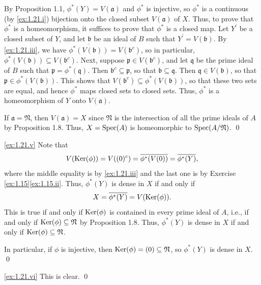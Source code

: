 By Proposition 1.1, $\phi^*(Y) = V(\mathfrak a)$ and $\phi^*$ is injective, so $\phi^*$ is a continuous (by \ref{ex:1.21.i}) bijection onto the closed subset $V(\mathfrak a)$ of $X$.
Thus, to prove that $\phi^*$ is a homeomorphism, it suffices to prove that $\phi^*$ is a closed map.
Let $Y^\prime$ be a closed subset of $Y$, and let $\mathfrak b$ be an ideal of $B$ such that $Y^\prime = V(\mathfrak b)$.
By \ref{ex:1.21.iii}, we have $\overline{\phi^*(V(\mathfrak b))} = V(\mathfrak b^c)$, so in particular, $\phi^*(V(\mathfrak b)) \subseteq V(\mathfrak b^c)$.
Next, suppose $\mathfrak p \in V(\mathfrak b^c)$, and let $\mathfrak q$ be the prime ideal of $B$ such that $\mathfrak p = \phi^*(\mathfrak q)$.
Then $\mathfrak b^c \subseteq \mathfrak p$, so that $\mathfrak b \subseteq \mathfrak q$.
Then $\mathfrak q \in V(\mathfrak b)$, so that $\mathfrak p \in \phi^*(V(\mathfrak b))$.
This shows that $V(\mathfrak b^c) \subseteq \phi^*(V(\mathfrak b))$, so that these two sets are equal, and hence $\phi^*$ maps closed sets to closed sets.
Thus, $\phi^*$ is a homeomorphism of $Y$ onto $V(\mathfrak a)$.

If $\mathfrak a = \mathfrak N$, then $V(\mathfrak a) = X$ since $\mathfrak N$ is the intersection of all the prime ideals of $A$ by Proposition 1.8.
Thus, $X=\operatorname{Spec}(A)$ is homeomorphic to $\operatorname{Spec}(A/\mathfrak N)$.
\qed

\noindent
\ref{ex:1.21.v}
Note that
\begin{equation*}
V(\operatorname{Ker}(\phi))
= V((0)^c)
= \overline{\phi^*(V(0))}
= \overline{\phi^*(Y)},
\end{equation*}
where the middle equality is by \ref{ex:1.21.iii} and the last one is by Exercise \ref{ex:1.15}\ref{ex:1.15.ii}.
Thus, $\phi^*(Y)$ is dense in $X$ if and only if
\begin{equation*}
X
= \overline{\phi^*(Y)}
= V(\operatorname{Ker}(\phi)).
\end{equation*}
This is true if and only if $\operatorname{Ker}(\phi)$ is contained in every prime ideal of $A$, i.e., if and only if $\operatorname{Ker}(\phi) \subseteq \mathfrak N$ by Proposition 1.8.
Thus, $\phi^*(Y)$ is dense in $X$ if and only if $\operatorname{Ker}(\phi) \subseteq \mathfrak N$.

In particular, if $\phi$ is injective, then $\operatorname{Ker}(\phi) = (0) \subseteq \mathfrak N$, so $\phi^*(Y)$ is dense in $X$.
\qed

\noindent
\ref{ex:1.21.vi}
This is clear.
\qed

